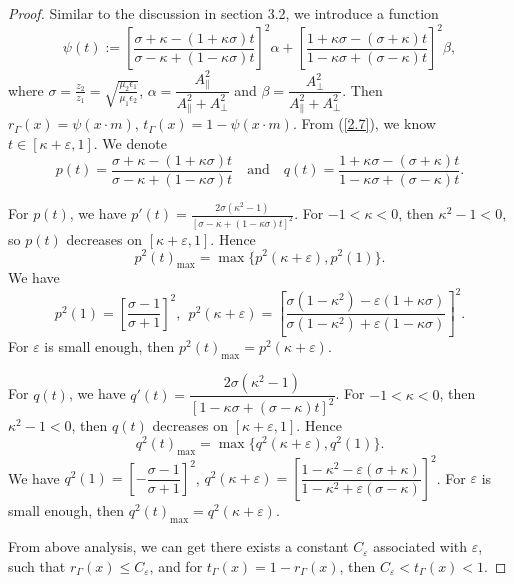 \documentclass[a4paper,12pt,]{article}
\numberwithin{equation}{section}
\numberwithin{equation}{section} \allowdisplaybreaks
\begin{document}
\begin{proof}
  Similar to the discussion in section 3.2, we introduce a function
  \begin{equation}\label{4.3}
    \psi(t) := \left[\frac{\sigma + \kappa -(1 + \kappa \sigma)t}{\sigma - \kappa + (1 - \kappa \sigma)t}\right]^{2} \alpha + \left[\frac{1 + \kappa \sigma - (\sigma + \kappa)t}{1 - \kappa \sigma + (\sigma - \kappa)t}\right]^{2} \beta,
  \end{equation}
  where $\sigma = \displaystyle \frac{z_{2}}{z_{1}} = \displaystyle \sqrt{\frac{\mu_{2}\epsilon_{1}}{\mu_{1}\epsilon_{2}}}$, $\alpha = \dfrac{A_{\parallel}^{2}}{A_{\parallel}^{2} + A_{\bot}^{2}}$ and $\beta = \dfrac{A_{\bot}^{2}}{A_{\parallel}^{2} + A_{\bot}^{2}}$. Then $r_{\Gamma}(x) = \psi(x \cdot m)$, $t_{\Gamma}(x) = 1- \psi(x \cdot m)$. From (\ref{2.7}), we know $t \in [\kappa + \varepsilon, 1]$. We denote
  $$p(t) = \frac{\sigma + \kappa -(1 + \kappa \sigma)t}{\sigma - \kappa + (1 - \kappa \sigma)t} \quad \text{and} \quad q(t) = \frac{1 + \kappa \sigma - (\sigma + \kappa)t}{1 - \kappa \sigma + (\sigma - \kappa)t}.$$
  
  For $p(t)$, we have $p'(t) = \displaystyle \frac{2 \sigma (\kappa^{2} - 1)}{[\sigma - \kappa + (1 - \kappa \sigma)t]^{2}}$.  For $-1< \kappa <0$, then $\kappa^{2} - 1 <0$, so $p(t)$ decreases on $[\kappa + \varepsilon,1]$. Hence 
  $$p^{2}(t)_{\max} = \max\{p^{2}(\kappa + \varepsilon), p^{2}(1)\}.$$
  We have 
  $$p^{2}(1) = \left[\dfrac{\sigma - 1}{\sigma + 1}\right]^{2},~~p^{2}(\kappa + \varepsilon) = \left[\dfrac{\sigma(1 - \kappa^{2}) - \varepsilon (1 + \kappa \sigma)}{\sigma(1 - \kappa^{2}) + \varepsilon (1 - \kappa \sigma)}\right]^{2}.$$
   For $\varepsilon$ is small enough, then $p^{2}(t)_{\max} = p^{2}(\kappa + \varepsilon)$.
  
  For $q(t)$, we have $q'(t) = \dfrac{2 \sigma (\kappa^{2} - 1)}{[1 - \kappa \sigma + (\sigma - \kappa)t]^{2}}$. For $-1< \kappa <0$, then $\kappa^{2} - 1 <0$, then $q(t)$ decreases on $[\kappa + \varepsilon,1]$. Hence 
  $$q^{2}(t)_{\max} = \max\{q^{2}(\kappa + \varepsilon), q^{2}(1)\}.$$
  We have $q^{2}(1) = \left[-\dfrac{\sigma - 1}{\sigma + 1}\right]^{2}$, $q^{2}(\kappa + \varepsilon) = \left[\dfrac{1 - \kappa^{2} - \varepsilon(\sigma + \kappa)}{1 - \kappa^{2} + \varepsilon(\sigma - \kappa)}\right]^{2}$. For $\varepsilon$ is small enough, then $q^{2}(t)_{\max} = q^{2}(\kappa + \varepsilon)$.
  
  From above analysis, we can get there exists a constant $C_{\varepsilon}$ associated with $\varepsilon$, such that $r_{\Gamma}(x) \leq C_{\varepsilon}$, and for $t_{\Gamma}(x) = 1 - r_{\Gamma}(x)$, then $C_{\varepsilon} < t_{\Gamma}(x) <1$.
\end{proof}
\end{document}
